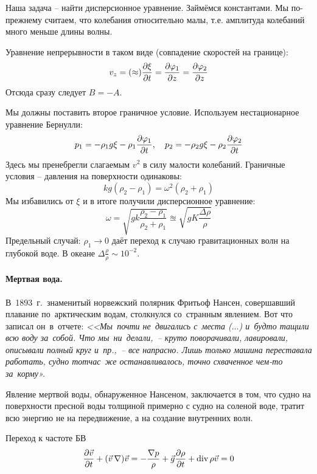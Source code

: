 Наша задача -- найти дисперсионное уравнение. Займёмся константами. Мы по-прежнему считаем, что колебания относительно малы,
т.е. амплитуда колебаний много меньше длины волны.

Уравнение непрерывности в таком виде (совпадение скоростей на границе):
\begin{equation}
    v_z = (\approx) \pdv{\xi}{t} = \pdv{\varphi_1}{z} = \pdv{\varphi_2}{z}
\end{equation}
Отсюда сразу следует $B = -A$.

Мы должны поставить второе граничное условие. Используем нестационарное уравнение Бернулли:
\begin{equation}
    p_1 = -\rho_1 g \xi - \rho_1 \pdv{\varphi_1}{t}, \quad
    p_2 = -\rho_2 g \xi - \rho_2 \pdv{\varphi_2}{t}
\end{equation}
Здесь мы пренебрегли слагаемым $v^2$ в силу малости колебаний.
Граничные условия -- давления на поверхности одинаковы:
\begin{equation}
    kg(\rho_2-\rho_1) = \omega^2(\rho_2+\rho_1)
\end{equation}
Мы избавились от $\xi$ и в итоге получили дисперсионное уравнение:
\begin{equation}
    \omega = \sqrt{gk\frac{\rho_2-\rho_1}{\rho_2+\rho_1}} \approxeq \sqrt{gK\frac{\Delta \rho}{\rho}}
\end{equation}
Предельный случай: $\rho_1 \to 0$ даёт переход к случаю гравитационных волн на глубокой воде. 
В океане $\Delta \frac{\rho}{\rho}\sim 10^{-2}$.

\paragraph{Мертвая вода.} В 1893 г. знаменитый норвежский полярник Фритьоф Нансен, совершавший плавание по арктическим водам, столкнулся со странным явлением. Вот что записал он в отчете: \textit{<<Мы почти не двигались с места ($\ldots$) и будто тащили всю воду за собой. Что мы ни делали, -- круто поворачивали, лавировали, описывали полный круг и пр., -- все напрасно. Лишь только машина переставала работать, судно тотчас же останавливалось, точно схваченное чем-то за корму».}

Явление мертвой воды, обнаруженное Нансеном, заключается в том, что судно на поверхности пресной воды толщиной примерно с судно на соленой воде, тратит всю энергию не на передвижение, а на создание внутренних волн.

Переход к частоте БВ
\begin{equation}
    \pdv{\vec{v}}{t}+(\vec{v}\,\nabla)\vec{v} = -\frac{\nabla p}{\rho}+\vec{g}\\
    \pdv{\rho}{t}+\operatorname{div} \rho \vec{v} = 0
\end{equation}

